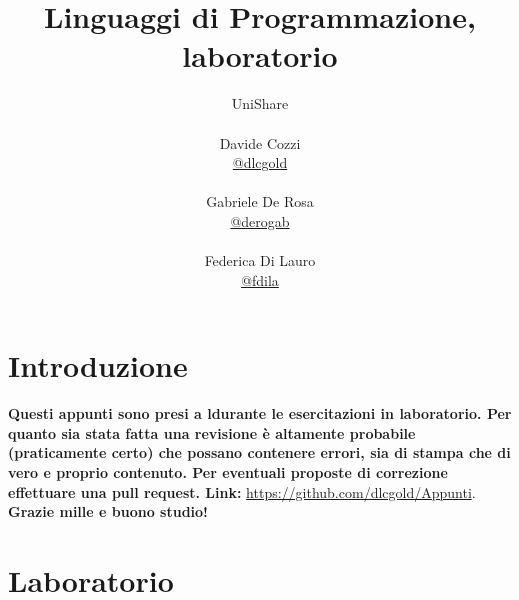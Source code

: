 \documentclass[a4paper,12pt, oneside]{book}
\title{Linguaggi di Programmazione, laboratorio}
\author{UniShare\\\\Davide Cozzi\\\href{https://t.me/dlcgold}{@dlcgold}\\\\Gabriele De Rosa\\\href{https://t.me/derogab}{@derogab} \\\\Federica Di Lauro\\\href{https://t.me/f_dila}{@f\textunderscore dila}}
\date{}
\begin{document}
\maketitle


\newtheorem{teorema}{Teorema}
\newtheorem{definizione}{Definizione}
\newtheorem{esempio}{Esempio}
\newtheorem{corollario}{Corollario}
\newtheorem{lemma}{Lemma}
\newtheorem{osservazione}{Osservazione}
\newtheorem{nota}{Nota}
\newtheorem{esercizio}{Esercizio}
\tableofcontents
\renewcommand{\chaptermark}[1]{%
\markboth{\chaptername
\ \thechapter.\ #1}{}}
\renewcommand{\sectionmark}[1]{\markright{\thesection.\ #1}}
\chapter{Introduzione}
\textbf{Questi appunti sono presi a ldurante le esercitazioni in laboratorio. Per quanto sia stata fatta una revisione è altamente probabile (praticamente certo) che possano contenere errori, sia di stampa che di vero e proprio contenuto. Per eventuali proposte di correzione effettuare una pull request. Link: } \url{https://github.com/dlcgold/Appunti}.\\
\textbf{Grazie mille e buono studio!}
\chapter{Laboratorio}
\end{document}

